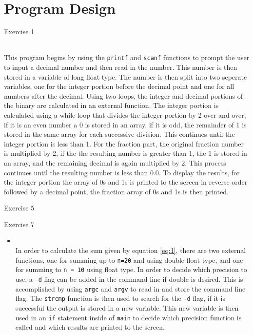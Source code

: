 \documentclass[11pt]{report}
\newcommand{\code}[1]{\colorbox{light-gray}{\texttt{#1}}}
\begin{document}
\section{Program Design}
\begin{outline}
\item Exercise 1
\begin{list}
    \item \\ This program begins by using the \code{printf} and \code{scanf} functions to prompt the user to input a decimal number and then read in the number. This number is then stored in a variable of long float type. The number is then split into two seperate variables, one for the integer portion before the decimal point and one for all numbers after the decimal. Using two loops, the integer and decimal portions of the binary are calculated in an external function. The integer portion is calculated using a while loop that divides the integer portion by 2 over and over, if it is an even number a 0 is stored in an array, if it is odd, the remainder of 1 is stored in the same array for each successive division. This continues until the integer portion is less than 1. For the fraction part, the original fraction number is multiplied by 2, if the the resulting number is greater than 1, the 1 is stored in an array, and the remaining decimal is again multiplied by 2. This process continues until the resulting number is less than 0.0. To display the results, for the integer portion the array of 0s and 1s is printed to the screen in reverse order followed by a decimal point, the fraction array of 0s and 1s is then printed.
\end{list}
\item Exercise 5
\item Exercise 7 \begin{itemize}
    \item \\ In order to calculate the sum given by equation \ref{eq:1}, there are two external functions, one for summing up to \code{n=20} and using double float type, and one for summing to \code{n = 10} using float type. In order to decide which precision to use, a \code{-d} flag can be added in the command line if double is desired. This is accomplished by using \code{argc} and \code{argv} to read in and store the command line flag. The \code{strcmp} function is then used to search for the \code{-d} flag, if it is successful the output is stored in a new variable. This new variable is then used in an \code{if} statement inside of \code{main} to decide which precision function is called and which results are printed to the screen. 
\end{itemize}
\end{outline}
\newpage
\end{document}
